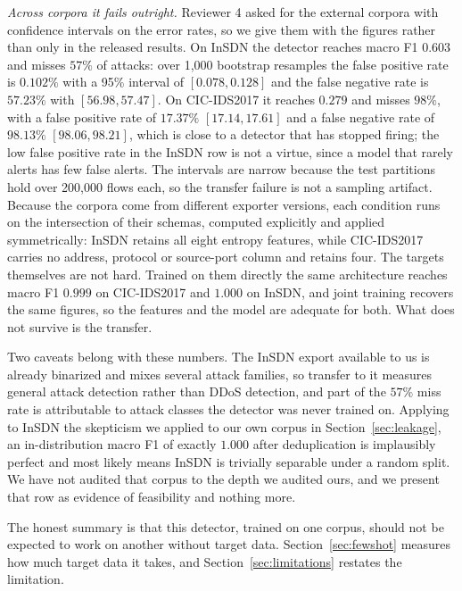 \documentclass{ieeeaccess}
\begin{document}
\emph{Across corpora it fails outright.} Reviewer 4 asked for the external
corpora with confidence intervals on the error rates, so we give them with the
figures rather than only in the released results. On InSDN the detector reaches
macro F1 $0.603$ and misses $57\%$ of attacks: over 1,000 bootstrap resamples the
false positive rate is $0.102\%$ with a 95\% interval of $[0.078, 0.128]$ and the
false negative rate is $57.23\%$ with $[56.98, 57.47]$. On CIC-IDS2017 it reaches
$0.279$ and misses $98\%$, with a false positive rate of $17.37\%$
$[17.14, 17.61]$ and a false negative rate of $98.13\%$ $[98.06, 98.21]$, which is
close to a detector that has stopped firing; the low false positive rate in the
InSDN row is not a virtue, since a model that rarely alerts has few false alerts.
The intervals are narrow because the test partitions hold over 200,000 flows
each, so the transfer failure is not a sampling artifact. Because the corpora
come from different exporter versions,
each condition runs on the intersection of their schemas, computed explicitly and
applied symmetrically: InSDN retains all eight entropy features, while
CIC-IDS2017 carries no address, protocol or source-port column and retains four.
The targets themselves are not hard. Trained on them directly the same
architecture reaches macro F1 $0.999$ on CIC-IDS2017 and $1.000$ on InSDN, and
joint training recovers the same figures, so the features and the model are
adequate for both. What does not survive is the transfer.

Two caveats belong with these numbers. The InSDN export available to us is
already binarized and mixes several attack families, so transfer to it measures
general attack detection rather than DDoS detection, and part of the $57\%$ miss
rate is attributable to attack classes the detector was never trained on.
Applying to InSDN the skepticism we applied to our own corpus in
Section~\ref{sec:leakage}, an in-distribution macro F1 of exactly $1.000$ after
deduplication is implausibly perfect and most likely means InSDN is trivially
separable under a random split. We have not audited that corpus to the depth we
audited ours, and we present that row as evidence of feasibility and nothing more.

The honest summary is that this detector, trained on one corpus, should not be
expected to work on another without target data. Section~\ref{sec:fewshot}
measures how much target data it takes, and Section~\ref{sec:limitations}
restates the limitation.
\end{document}
